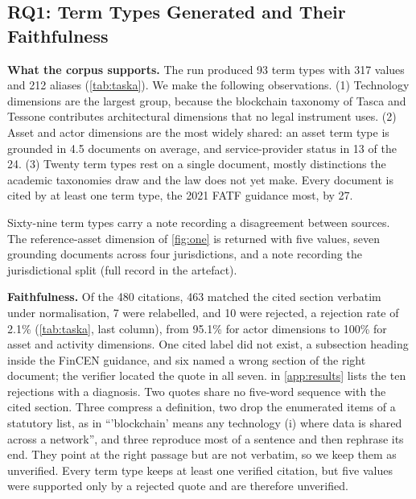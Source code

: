 \subsection{RQ1: Term Types Generated and Their Faithfulness}
\label{sec:exp:rq1}

\begin{table}[t]
  \centering
  \caption{Term types by category. Docs is the mean number of source documents
  grounding a term type; Single counts term types grounded in one document;
  Confl.\ counts term types whose notes record a disagreement between sources;
  Verif.\ is the share of citations whose quote the verifier found in the cited
  document, exact or relabelled. Single run.}
  \label{tab:taska}
  \scriptsize
  
\end{table}


\textbf{What the corpus supports.} The run produced 93 term types with 317
values and 212 aliases (\cref{tab:taska}). We make the
following observations. (1) Technology dimensions are the largest group,
because the blockchain taxonomy of Tasca and Tessone contributes architectural
dimensions that no legal instrument uses. (2) Asset and actor dimensions are the most
widely shared: an asset term type is grounded in 4.5 documents on average,
and service-provider status in 13 of the 24. (3) Twenty term types rest on a single document, mostly distinctions the
academic taxonomies draw and the law does not yet make. Every document is
cited by at least one term type, the 2021 FATF guidance most, by 27.


Sixty-nine term types carry a note recording a disagreement between sources.
The reference-asset dimension of \cref{fig:one} is returned with five
values, seven grounding documents across four jurisdictions, and a note
recording the jurisdictional split (full record in the artefact).


\textbf{Faithfulness.} Of the 480 citations, 463 matched the cited section
verbatim under normalisation, 7 were relabelled, and 10 were rejected, a
rejection rate of 2.1\% (\cref{tab:taska}, last column), from 95.1\% for actor
dimensions to 100\% for asset and activity dimensions. One cited label did not exist, a subsection heading inside
the FinCEN guidance, and six named a wrong section of the right document; the
verifier located the quote in all seven.  in \cref{app:results} lists the ten rejections with a
diagnosis. Two
quotes share no five-word sequence with the cited section. Three compress a
definition, two drop the enumerated items of a statutory list, as in
``'blockchain' means any technology (i) where data is shared across a
network'', and three reproduce most of a sentence and then rephrase its end.
They point at the right passage but are not verbatim, so we keep them as
unverified. Every term type keeps at
least one verified citation, but five values were supported only by a rejected
quote and are therefore unverified.

